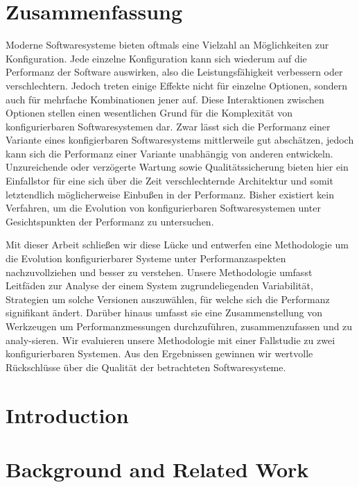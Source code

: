 \documentclass[
	12pt,
	a4paper,
	oneside,
	openright,
	listof=totoc%
]{scrbook}
\begin{document}
\newpage
\chapter*{Zusammenfassung}
Moderne Softwaresysteme bieten oftmals eine Vielzahl an Möglichkeiten zur
Konfiguration. Jede einzelne Konfiguration kann sich wiederum auf die
Performanz der Software auswirken, also die Leistungsfähigkeit verbessern oder
verschlechtern.
Jedoch treten einige Effekte nicht für einzelne Optionen, sondern auch für
mehrfache Kombinationen jener auf. Diese Interaktionen zwischen Optionen stellen einen wesentlichen
Grund für die Komplexität von konfigurierbaren Softwaresystemen dar.
Zwar lässt sich die Performanz einer Variante eines konfigierbaren
Softwaresystems mittlerweile gut abschätzen, jedoch kann sich die  Performanz
einer Variante unabhängig von anderen entwickeln. Unzureichende  oder verzögerte
Wartung sowie Qualitätssicherung bieten hier ein Einfallstor für eine sich über
die Zeit verschlechternde Architektur und somit letztendlich  möglicherweise
Einbußen in der Performanz. Bisher existiert kein Verfahren, um die Evolution
von konfigurierbaren Softwaresystemen unter Gesichtspunkten der Performanz zu untersuchen.

Mit dieser Arbeit schließen wir diese Lücke und entwerfen eine Methodologie um
die Evolution konfigurierbarer Systeme unter Performanzaspekten
nachzuvollziehen und besser zu verstehen. Unsere Methodologie umfasst Leitfäden
zur Analyse der einem System zugrundeliegenden Variabilität, Strategien um
solche Versionen auszuwählen, für welche sich die Performanz signifikant ändert.
Darüber hinaus umfasst sie eine Zusammenstellung von Werkzeugen um
Performanzmessungen durchzuführen, zusammenzufassen und zu analy-sieren. 
Wir evaluieren unsere Methodologie mit einer Fallstudie zu zwei
konfigurierbaren Systemen. Aus den Ergebnissen gewinnen wir wertvolle
Rückschlüsse über die Qualität der betrachteten Softwaresysteme.

\tableofcontents

\listoffigures
\listoftables



\mainmatter
{}

\chapter{Introduction}\label{chapter:1}
\setcounter{page}{1}


\chapter{Background and Related Work}\label{chapter:2}

\end{document}
